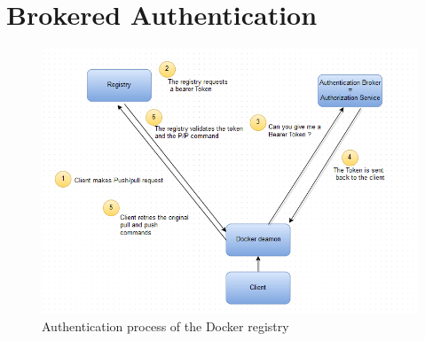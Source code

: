 \section{Brokered Authentication}

\begin{figure}[H]
\centering
\includegraphics[scale=0.7]{5-patterns/images/Authentication.png}
\caption{Authentication process of the Docker registry }
\label{fig:auth-process}
\end{figure}

